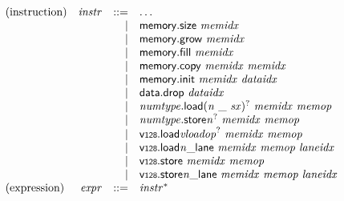 $$
\begin{array}{@{}lrrl@{}l@{}}
\mbox{(instruction)} & {\mathit{instr}} &::=& \dots \\ &&|&
\mathsf{memory.size}~{\mathit{memidx}} \\ &&|&
\mathsf{memory.grow}~{\mathit{memidx}} \\ &&|&
\mathsf{memory.fill}~{\mathit{memidx}} \\ &&|&
\mathsf{memory.copy}~{\mathit{memidx}}~{\mathit{memidx}} \\ &&|&
\mathsf{memory.init}~{\mathit{memidx}}~{\mathit{dataidx}} \\ &&|&
\mathsf{data.drop}~{\mathit{dataidx}} \\ &&|&
{{\mathit{numtype}}.\mathsf{load}}{{({\mathit{n}}~\mathsf{\_}~{\mathit{sx}})^?}}~{\mathit{memidx}}~{\mathit{memop}} \\ &&|&
{{\mathit{numtype}}.\mathsf{store}}{{{\mathit{n}}^?}}~{\mathit{memidx}}~{\mathit{memop}} \\ &&|&
{\mathsf{v{\scriptstyle128}.load}}{{{\mathit{vloadop}}^?}}~{\mathit{memidx}}~{\mathit{memop}} \\ &&|&
{{{\mathsf{v{\scriptstyle128}.load}}{{\mathit{n}}}}{\mathsf{\_}}}{\mathsf{lane}}~{\mathit{memidx}}~{\mathit{memop}}~{\mathit{laneidx}} \\ &&|&
\mathsf{v{\scriptstyle128}.store}~{\mathit{memidx}}~{\mathit{memop}} \\ &&|&
{{{\mathsf{v{\scriptstyle128}.store}}{{\mathit{n}}}}{\mathsf{\_}}}{\mathsf{lane}}~{\mathit{memidx}}~{\mathit{memop}}~{\mathit{laneidx}} \\
\mbox{(expression)} & {\mathit{expr}} &::=& {{\mathit{instr}}^\ast} \\
\end{array}
$$

\vspace{1ex}

